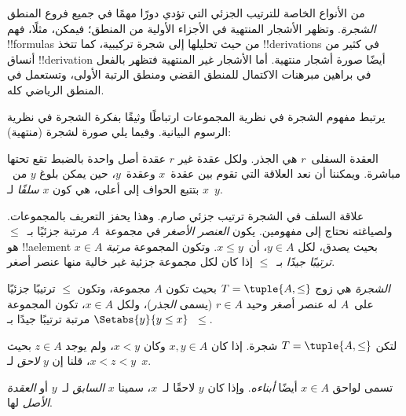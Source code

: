 \documentclass[../../../include/open-logic-section]{subfiles}
\begin{document}

من الأنواع الخاصة للترتيب الجزئي التي تؤدي دورًا مهمًا في جميع فروع
المنطق \emph{الشجرة}. وتظهر الأشجار المنتهية في الأجزاء الأولية من المنطق؛
فيمكن، مثلًا، فهم !!{formula}s من حيث تحليلها إلى شجرة تركيبية، كما تتخذ
!!{derivation}s في كثير من أنساق !!{derivation} أيضًا صورة أشجار منتهية.
%
أما الأشجار غير المنتهية فتظهر بالفعل في براهين مبرهنات الاكتمال للمنطق القضي
ومنطق الرتبة الأولى، وتستعمل في المنطق الرياضي كله.

يرتبط مفهوم الشجرة في نظرية المجموعات ارتباطًا وثيقًا بفكرة الشجرة في
نظرية الرسوم البيانية. وفيما يلي صورة لشجرة (منتهية):

\begin{center}
\end{center}

العقدة السفلى~$r$ هي الجذر. ولكل عقدة غير $r$ عقدة أصل واحدة بالضبط تقع
تحتها مباشرة. ويمكننا أن نعد العلاقة التي تقوم بين عقدة~$x$ وعقدة~$y$،
حين يمكن بلوغ $y$ من~$x$ بتتبع الحواف إلى أعلى، هي كون $x$
\emph{سلفًا} لـ~$y$.

علاقة السلف في الشجرة ترتيب جزئي صارم. وهذا يحفز التعريف بالمجموعات.
ولصياغته نحتاج إلى مفهومين. يكون \emph{العنصر الأصغر} في مجموعة~$A$
مرتبة جزئيًا بـ~$\le$ هو !!a{element} $x \in A$ بحيث يصدق، لكل
$y \in A$، أن~$x \le y$. وتكون المجموعة \emph{مرتبة ترتيبًا جيدًا}
بـ~$\le$ إذا كان لكل مجموعة جزئية غير خالية منها عنصر أصغر.

\begin{defn}[الشجرة]
\emph{الشجرة} هي زوج $T = \tuple{A, \le}$ بحيث تكون $A$ مجموعة، وتكون
$\le$ ترتيبًا جزئيًا على~$A$ له عنصر أصغر وحيد $r \in A$ (يسمى
\emph{الجذر})، ولكل $x \in A$، تكون المجموعة $\Setabs{y}{y \le x}$
مرتبة ترتيبًا جيدًا بـ~$\le$.
\end{defn}

\begin{defn}[اللواحق]
لتكن $T = \tuple{A, \le}$ شجرة.
إذا كان $x,y \in A$ وكان $x < y$، ولم يوجد $z \in A$ بحيث
$x < z < y$، قلنا إن $y$ \emph{لاحق} لـ~$x$.
\end{defn}

تسمى لواحق $x \in A$ أيضًا \emph{أبناءه}. وإذا كان
$y$ لاحقًا لـ~$x$، سمينا $x$ \emph{السابق} لـ~$y$ أو
\emph{العقدة الأصل} لها.
\end{document}
